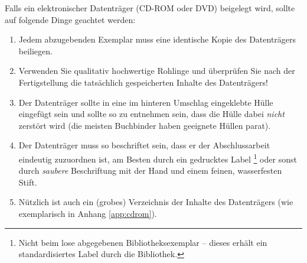 Falls ein elektronischer Datenträger (CD-ROM oder DVD) beigelegt
wird, sollte auf folgende Dinge geachtet werden:
%
\begin{enumerate}
\item Jedem abzugebenden Exemplar muss eine identische Kopie des
Datenträgers beiliegen. %
\item Verwenden Sie qualitativ hochwertige Rohlinge und überprüfen
Sie nach der Fertigstellung die tatsächlich gespeicherten Inhalte
des Datenträgers! %
\item Der Datenträger sollte in eine im hinteren Umschlag
eingeklebte Hülle eingefügt sein und sollte so zu entnehmen sein,
dass die Hülle dabei \emph{nicht} zerstört wird (die
meisten Buchbinder haben geeignete Hüllen parat). %
\item Der Datenträger muss so beschriftet sein, dass er der
Abschlussarbeit eindeutig zuzuordnen ist, am Besten durch ein
gedrucktes Label%
\footnote{Nicht beim lose abgegebenen Bibliotheksexemplar --
dieses erhält ein standardisiertes Label durch die Bibliothek.} %
oder sonst durch \emph{saubere}
Beschriftung mit
der Hand und einem feinen, wasserfesten Stift. %
\item Nützlich ist auch ein (grobes) Verzeichnis der Inhalte des
Datenträgers (wie exemplarisch in Anhang \ref{app:cdrom}).
\end{enumerate}

